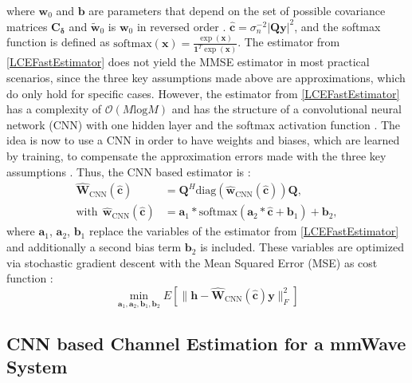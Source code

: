 \documentclass[12pt, draftclsnofoot, onecolumn]{IEEEtran}
\begin{document}
where ${\mathbf{w}}_0$ and ${\mathbf{b}}$ are parameters that depend on the set of possible covariance matrices $ {\mathbf{C}}_{\boldsymbol{\delta}}$ and $\tilde{\mathbf{w}}_0$ is ${\mathbf{w}}_0$ in reversed order \cite{Neumann,Hellings}. $\hat{\mathbf{c}} = {\sigma^{-2}_n} |\mathbf{Qy}|^2$, and the softmax function is defined as $\text{softmax}(\mathbf{x}) = \frac{ \exp{( \mathbf{x} )} } { \mathbf{1}^T\exp{(\mathbf{x})}}$. The estimator from \eqref{LCEFastEstimator} does not yield the MMSE estimator in most practical scenarios, since the three key assumptions made above are approximations, which do only hold for specific cases. However, the estimator from \eqref{LCEFastEstimator} has a complexity of $\mathcal{O}(M \text{log}M)$ and has the structure of a convolutional neural network (CNN) with one hidden layer and the softmax activation function \cite{Neumann}. The idea is now to use a CNN in order to have weights and biases, which are learned by training, to compensate the approximation errors made with the three key assumptions \cite{Neumann}. Thus, the CNN based estimator is \cite{Neumann}:
\begin{align}
    \hat{\mathbf{W}}_\text{CNN}(\hat{\mathbf{c}}) &= \mathbf{Q}^H \mathrm{diag}(\hat{\mathbf{w}}_{\text{CNN}}(\hat{\mathbf{c}})) \mathbf{Q}, \\
    \text{with} \ \  \hat{\mathbf{w}}_{\text{CNN}}(\hat{\mathbf{c}}) &= \mathbf{a}_1 * \text{softmax}({\mathbf{a}}_2*\hat{\mathbf{c}}+\mathbf{b}_1) + \mathbf{b}_2,
\end{align}
where $\mathbf{a}_1$, $\mathbf{a}_2$, $\mathbf{b}_1$ replace the variables of the estimator from \eqref{LCEFastEstimator} and additionally a second bias term $\mathbf{b}_2$ is included. These variables are optimized via stochastic gradient descent with the Mean Squared Error (MSE) as cost function \cite{Neumann,Hellings,Koller}:
\begin{equation}
    \min_{\mathbf{a}_1, \mathbf{a}_2, \mathbf{b}_1, \mathbf{b}_2 } E[\| \mathbf{h}- \hat{\mathbf{W}}_\text{CNN}(\hat{\mathbf{c}}) \mathbf{y} \|_F^2]
\end{equation}

\subsection{CNN based Channel Estimation for a mmWave System}
\end{document}
